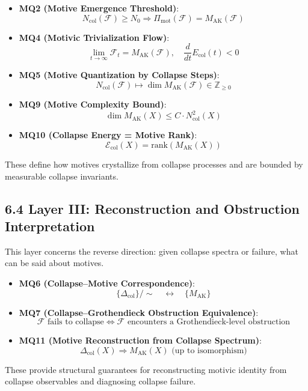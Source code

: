 \documentclass[11pt]{article}
\begin{document}
\begin{itemize}
    \item \textbf{MQ2 (Motive Emergence Threshold)}:
    \[
    N_{\mathrm{col}}(\mathcal{F}) \geq N_0 \Rightarrow \Pi_{\mathrm{mot}}(\mathcal{F}) = M_{\mathrm{AK}}(\mathcal{F})
    \]
    \item \textbf{MQ4 (Motivic Trivialization Flow)}:
    \[
    \lim_{t \to \infty} \mathcal{F}_t = M_{\mathrm{AK}}(\mathcal{F}), \quad \frac{d}{dt}E_{\mathrm{col}}(t) < 0
    \]
    \item \textbf{MQ5 (Motive Quantization by Collapse Steps)}:
    \[
    N_{\mathrm{col}}(\mathcal{F}) \mapsto \dim M_{\mathrm{AK}}(\mathcal{F}) \in \mathbb{Z}_{\geq 0}
    \]
    \item \textbf{MQ9 (Motive Complexity Bound)}:
    \[
    \dim M_{\mathrm{AK}}(X) \leq C \cdot N_{\mathrm{col}}^2(X)
    \]
    \item \textbf{MQ10 (Collapse Energy = Motive Rank)}:
    \[
    \mathcal{E}_{\mathrm{col}}(X) = \mathrm{rank}(M_{\mathrm{AK}}(X))
    \]
\end{itemize}

These define how motives crystallize from collapse processes and are bounded by measurable collapse invariants.

\subsection{6.4 Layer III: Reconstruction and Obstruction Interpretation}

This layer concerns the reverse direction: given collapse spectra or failure, what can be said about motives.

\begin{itemize}
    \item \textbf{MQ6 (Collapse–Motive Correspondence)}:
    \[
    \{ \Delta_{\mathrm{col}} \} / \sim \quad \longleftrightarrow \quad \{ M_{\mathrm{AK}} \}
    \]
    \item \textbf{MQ7 (Collapse–Grothendieck Obstruction Equivalence)}:
    \[
    \mathcal{F} \text{ fails to collapse} \iff \mathcal{F} \text{ encounters a Grothendieck-level obstruction}
    \]
    \item \textbf{MQ11 (Motive Reconstruction from Collapse Spectrum)}:
    \[
    \Delta_{\mathrm{col}}(X) \Rightarrow M_{\mathrm{AK}}(X) \text{ (up to isomorphism)}
    \]
\end{itemize}

These provide structural guarantees for reconstructing motivic identity from collapse observables and diagnosing collapse failure.
\end{document}
